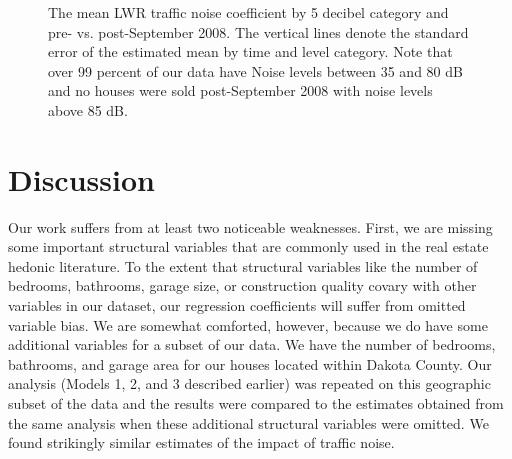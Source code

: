\documentclass{article}\usepackage{graphicx, color}
\begin{document}
\begin{figure}
\caption{The mean LWR traffic noise coefficient by 5 decibel category and pre- vs. post-September 2008. The vertical lines denote the standard error of the estimated mean by time and level category. Note that over 99 percent of our data have Noise levels between 35 and 80 dB and no houses were sold post-September 2008 with noise levels above 85 dB.}\label{fig:betaMAXvCat}
\end{figure}


\section{Discussion}\label{Discussion}

Our work suffers from at least two noticeable weaknesses. First, we are missing some important structural variables that are commonly used in the real estate hedonic literature. To the extent that structural variables like the number of bedrooms, bathrooms, garage size, or construction quality covary with other variables in our dataset, our regression coefficients will suffer from omitted variable bias. We are somewhat comforted, however, because we do have some additional variables for a subset of our data. We have the number of bedrooms, bathrooms, and garage area for our houses located within Dakota County. Our analysis (Models 1, 2, and 3 described earlier) was repeated on this geographic subset of the data and the results were compared to the estimates obtained from the same analysis when these additional structural variables were omitted. We found strikingly similar estimates of the impact of traffic noise.
\end{document}

